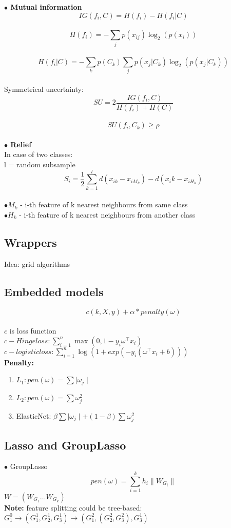 \documentclass[11pt]{article}
\begin{document}
\textbf{$\bullet$ Mutual information} \\

$$IG(f_i, C) = H(f_i) - H(f_i|C)$$ \\
$$H(f_i) = - \sum_{j} p(x_{ij}) \log_{2}(p(x_i))$$ \\
$$H(f_i|C) = - \sum_{k} p(C_k)\sum_{j} p(x_j|C_k) \log_{2}(p(x_j|C_k))$$ \\

Symmetrical uncertainty: \\

$$SU = 2 \frac{IG(f_i, C)}{H(f_i)+H(C)}$$ \\
$$SU(f_i, C_k) \geq \rho $$ \\

\textbf{$\bullet$ Relief} \\
In case of two classes: \\
l = random subsample \\
$$S_i = \frac{1}{2} \sum_{k=1}^l d(x_{ik} - x_{iM_k}) - d(x_ik - x_{iH_k})$$ \\
$\bullet M_k$ - i-th feature of k nearest neighbours from same class \\
$\bullet H_k$ - i-th feature of k nearest neighbours from another class \\

\subsection{Wrappers} 
Idea: grid algorithms \\

\subsection{Embedded models}

$$c(k, X, y) + \alpha*penalty(\omega) $$ \\
$c$ is loss function\\
$c - Hinge loss: \sum_{i=1}^n \max(0, 1-y_i \omega^{\top} x_i)$ \\
$c - logistic loss: \sum_{i=1}^n \log (1+exp(-y_i(\omega^{\top}x_i + b))) $ \\

\textbf{Penalty:}
\begin{enumerate}
\item $L_1: pen(\omega) = \sum \mid \omega_j \mid$
\item $L_2: pen(\omega) = \sum \omega_j^{2}$
\item ElasticNet: $\beta \sum \mid \omega_j \mid + (1-\beta) \sum \omega_j^{2} $
\end{enumerate}

\subsection{Lasso and GroupLasso}
$\bullet$ GroupLasso \\
$$pen(\omega) = \sum_{i=1}^k h_i \parallel W_{G_i} \parallel $$
$W = (W_{G_1} \ldots W_{G_k})$ \\

\textbf{Note:} feature splitting could be tree-based: $G_1^{0} \rightarrow (G_1^{1}, G_2^{1}, G_3^{1}) \rightarrow (G_1^{2}, (G_2^{2}, G_3^{2}), G_3^{1})$
\end{document}
